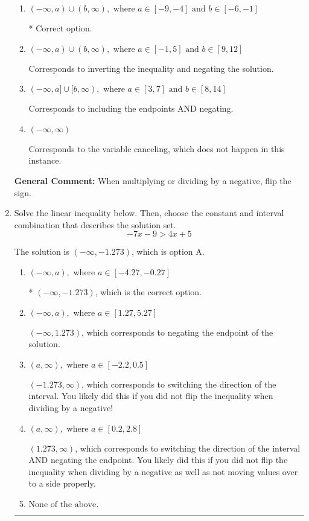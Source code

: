 \documentclass{extbook}[14pt]
\newcommand{\litem}[1]{\item #1

\rule{\textwidth}{0.4pt}}
\begin{document}
\begin{enumerate}
{\begin{enumerate}[label=\Alph*.]
Corresponds to including the endpoints (when they should be excluded).
\item \( (-\infty, a) \cup (b, \infty), \text{ where } a \in [-9, -4] \text{ and } b \in [-6, -1] \)

 * Correct option.
\item \( (-\infty, a) \cup (b, \infty), \text{ where } a \in [-1, 5] \text{ and } b \in [9, 12] \)

Corresponds to inverting the inequality and negating the solution.
\item \( (-\infty, a] \cup [b, \infty), \text{ where } a \in [3, 7] \text{ and } b \in [8, 14] \)

Corresponds to including the endpoints AND negating.
\item \( (-\infty, \infty) \)

Corresponds to the variable canceling, which does not happen in this instance.
\end{enumerate}

\textbf{General Comment:} When multiplying or dividing by a negative, flip the sign.
}
\litem{
Solve the linear inequality below. Then, choose the constant and interval combination that describes the solution set.
\[ -7x -9 > 4x + 5 \]

The solution is \( (-\infty, -1.273) \), which is option A.\begin{enumerate}[label=\Alph*.]
\item \( (-\infty, a), \text{ where } a \in [-4.27, -0.27] \)

* $(-\infty, -1.273)$, which is the correct option.
\item \( (-\infty, a), \text{ where } a \in [1.27, 5.27] \)

 $(-\infty, 1.273)$, which corresponds to negating the endpoint of the solution.
\item \( (a, \infty), \text{ where } a \in [-2.2, 0.5] \)

 $(-1.273, \infty)$, which corresponds to switching the direction of the interval. You likely did this if you did not flip the inequality when dividing by a negative!
\item \( (a, \infty), \text{ where } a \in [0.2, 2.8] \)

 $(1.273, \infty)$, which corresponds to switching the direction of the interval AND negating the endpoint. You likely did this if you did not flip the inequality when dividing by a negative as well as not moving values over to a side properly.
\item \( \text{None of the above}. \)


\end{enumerate}}
\end{enumerate}
\end{document}
